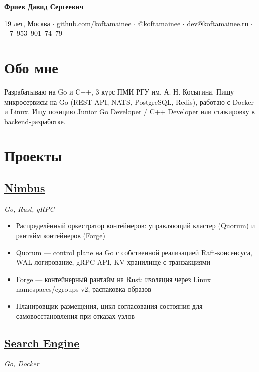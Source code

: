 \documentclass[a4paper,11pt]{article}
\begin{document}
\begin{center}
  {\Huge\bfseries\sffamily Фриев Давид Сергеевич}
  \vspace{0.2em}

  19 лет, Москва $\cdot$
  \href{https://github.com/koftamainee}{github.com/koftamainee} $\cdot$
  \href{https://t.me/koftamainee}{@koftamainee} $\cdot$
  \href{mailto:dev@koftamainee.ru}{dev@koftamainee.ru} $\cdot$
  +7~953~901~74~79
\end{center}

\section{Обо мне}

Разрабатываю на Go и C++, 3 курс ПМИ РГУ им. А. Н. Косыгина.
Пишу микросервисы на Go (REST API, NATS, PostgreSQL, Redis), работаю с Docker и Linux.
Ищу позицию Junior Go Developer / C++ Developer или стажировку в backend-разработке.

\section{Проекты}

\subsection*{\href{https://github.com/koftamainee/nimbus}{Nimbus}}
\hfill \textit{Go, Rust, gRPC}

\begin{itemize}
  \item Распределённый оркестратор контейнеров: управляющий кластер (Quorum) и рантайм контейнеров (Forge)
  \item Quorum --- control plane на Go с собственной реализацией Raft-консенсуса, WAL-логирование, gRPC API, KV-хранилище с транзакциями
  \item Forge --- контейнерный рантайм на Rust: изоляция через Linux namespaces/cgroups v2, распаковка образов
  \item Планировщик размещения, цикл согласования состояния для самовосстановления при отказах узлов
\end{itemize}

\subsection*{\href{https://github.com/koftamainee/search-engine}{Search Engine}}
\hfill \textit{Go, Docker}
\end{document}
